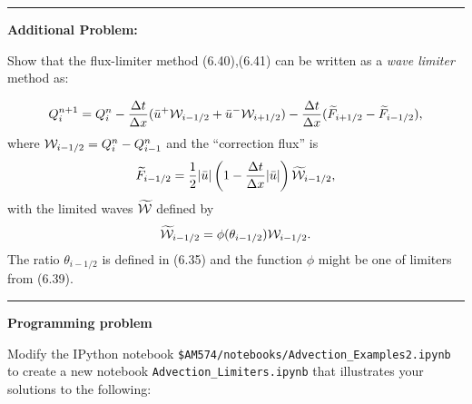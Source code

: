 \documentclass[11pt]{article}
\begin{document}



\vskip 1cm
\hrule
{\bf Additional Problem:}

Show that the flux-limiter method (6.40),(6.41) can be written as a {\em
wave limiter} method as:

\[
Q_i^{n+1} = Q_i^n - \frac{\Delta t}{\Delta x} (\bar u^+ {\cal W}_{i-1/2}  + \bar u^- {\cal W}_{i+1/2})
-\frac{\Delta t}{\Delta x} (\widetilde F_{i+1/2} - \widetilde F_{i-1/2}),
\]
where ${\cal W}_{i-1/2} = Q_i^n - Q_{i-1}^n$ and the ``correction flux'' is
\[
\widetilde F_{i-1/2} = {\frac{1}{2}} |\bar u| 
\left(1 - \frac{\Delta t}{\Delta x} |\bar u|\right) \widetilde {{\cal W}}_{i-1/2},
\]
with the limited waves $\widetilde {{\cal W}}$ defined by
\[
\widetilde {{\cal W}}_{i-1/2} = \phi(\theta_{i-1/2}) {\cal W}_{i-1/2}.
\]
The ratio $\theta_{i-1/2}$ is defined in (6.35) and the
function $\phi$ might be one of limiters from (6.39).



\newpage

\vskip 1cm
\hrule
{\bf Programming problem}

Modify the IPython notebook \verb+$AM574/notebooks/Advection_Examples2.ipynb+
to create a new notebook \verb+Advection_Limiters.ipynb+ that illustrates
your solutions to the following:
\end{document}
